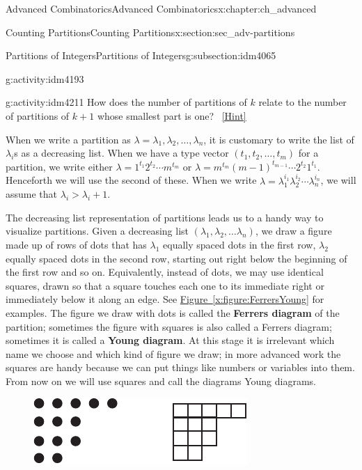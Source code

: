 \documentclass[oneside,10pt,]{book}
\newcommand{\terminology}[1]{\textbf{#1}}
\numberwithin{equation}{chapter}
\begin{document}
\begin{chapterptx}{Advanced Combinatorics}{}{Advanced Combinatorics}{}{}{x:chapter:ch_advanced}
\begin{sectionptx}{Counting Partitions}{}{Counting Partitions}{}{}{x:section:sec_adv-partitions}
\begin{subsectionptx}{Partitions of Integers}{}{Partitions of Integers}{}{}{g:subsection:idm4065}
\begin{activity}{}{g:activity:idm4193}
\end{activity}
\begin{activity}{}{g:activity:idm4211}%
How does the number of partitions of \(k\) relate to the number of partitions of \(k+1\) whose smallest part is one?%
\qquad~\hfill{\tiny\hyperlink{g:hint:idm4216-back}{[Hint]}}\end{activity}
When we write a partition as \(\lambda = \lambda_1,\lambda_2,\ldots,\lambda_n\), it is customary to write the list of \(\lambda_i\)s as a decreasing list. When we have a type vector \((t_1,t_2,\ldots,t_m)\) for a partition, we write either \(\lambda = 1^{t_1}2^{t_2}\cdots m^{t_m}\) or \(\lambda = m^{t_m}(m-1)^{t_{m-1}}\cdots 2^{t_2}1^{t_1}\). Henceforth we will use the second of these. When we write \(\lambda=\lambda_1^{i_1}\lambda_2^{i_2}\cdots\lambda_n^{i_n}\), we will assume that \(\lambda_i>\lambda_i+1\).%
\par
The decreasing list representation of partitions leads us to a handy way to visualize partitions. Given a decreasing list \((\lambda_1,\lambda_2,\ldots \lambda_n)\), we draw a figure made up of rows of dots that has \(\lambda_1\) equally spaced dots in the first row, \(\lambda_2\) equally spaced dots in the second row, starting out right below the beginning of the first row and so on. Equivalently, instead of dots, we may use identical squares, drawn so that a square touches each one to its immediate right or immediately below it along an edge. See \hyperref[x:figure:FerrersYoung]{Figure~\ref{x:figure:FerrersYoung}} for examples. The figure we draw with dots is called the \terminology{Ferrers diagram} of the partition; sometimes the figure with squares is also called a Ferrers diagram; sometimes it is called a \terminology{Young diagram}. At this stage it is irrelevant which name we choose and which kind of figure we draw; in more advanced work the squares are handy because we can put things like numbers or variables into them.  From now on we will use squares and call the diagrams Young diagrams.%
\begin{figure}
\centering
\includegraphics[width=0.45\linewidth]{images/FerrersYoung}

\end{figure}
\end{subsectionptx}
\end{sectionptx}
\end{chapterptx}
\end{document}
